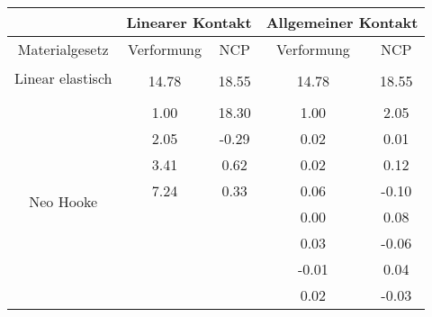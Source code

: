 \begin{table} 
\centering 
\begin{tabular}{c|cc|cc|} 
\cline{2-5} 
 & \multicolumn{2}{|c|}{Linearer Kontakt} & \multicolumn{2}{|c|}{Allgemeiner Kontakt} \\ 
\hline 
\multicolumn{1}{|c|}{Materialgesetz} & \multicolumn{1}{c|}{Verformung} & \multicolumn{1}{c|}{NCP} & \multicolumn{1}{c|}{Verformung} & \multicolumn{1}{c|}{NCP} \\ 
\hline 
\multicolumn{1}{|c|}{\multirow{2}{*}{Linear elastisch}} &\multicolumn{1}{|c|}{} & \multicolumn{1}{|c|}{} & \multicolumn{1}{|c|}{} & \multicolumn{1}{|c|}{} \\ 
\multicolumn{1}{|c|}{} & \multicolumn{1}{|c|}{     14.78} & \multicolumn{1}{|c|}{     18.55} & \multicolumn{1}{|c|}{     14.78} & \multicolumn{1}{|c|}{     18.55} \\ 
\hline 
\multicolumn{1}{|c|}{\multirow{101}{*}{Neo Hooke}} &\multicolumn{1}{|c|}{} & \multicolumn{1}{|c|}{} & \multicolumn{1}{|c|}{} & \multicolumn{1}{|c|}{} \\ 
\multicolumn{1}{|c|}{} & \multicolumn{1}{|c|}{      1.00} & \multicolumn{1}{|c|}{     18.30} & \multicolumn{1}{|c|}{      1.00} & \multicolumn{1}{|c|}{      2.05} \\ 
\multicolumn{1}{|c|}{} & \multicolumn{1}{|c|}{      2.05} & \multicolumn{1}{|c|}{     -0.29} & \multicolumn{1}{|c|}{      0.02} & \multicolumn{1}{|c|}{      0.01} \\ 
\multicolumn{1}{|c|}{} & \multicolumn{1}{|c|}{      3.41} & \multicolumn{1}{|c|}{      0.62} & \multicolumn{1}{|c|}{      0.02} & \multicolumn{1}{|c|}{      0.12} \\ 
\multicolumn{1}{|c|}{} & \multicolumn{1}{|c|}{      7.24} & \multicolumn{1}{|c|}{      0.33} & \multicolumn{1}{|c|}{      0.06} & \multicolumn{1}{|c|}{     -0.10} \\ 
\multicolumn{1}{|c|}{} & \multicolumn{1}{|c|}{} & \multicolumn{1}{|c|}{} & \multicolumn{1}{|c|}{      0.00} & \multicolumn{1}{|c|}{      0.08} \\ 
\multicolumn{1}{|c|}{} & \multicolumn{1}{|c|}{} & \multicolumn{1}{|c|}{} & \multicolumn{1}{|c|}{      0.03} & \multicolumn{1}{|c|}{     -0.06} \\ 
\multicolumn{1}{|c|}{} & \multicolumn{1}{|c|}{} & \multicolumn{1}{|c|}{} & \multicolumn{1}{|c|}{     -0.01} & \multicolumn{1}{|c|}{      0.04} \\ 
\multicolumn{1}{|c|}{} & \multicolumn{1}{|c|}{} & \multicolumn{1}{|c|}{} & \multicolumn{1}{|c|}{      0.02} & \multicolumn{1}{|c|}{     -0.03} \\ 

\end{tabular}
\end{table}
